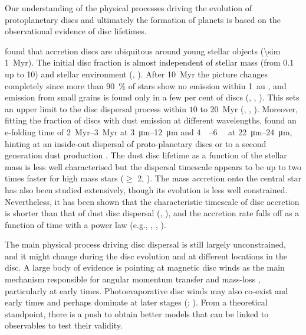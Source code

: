 \documentclass[usenatbib,useAMS,usedcolumn]{mnras}
\begin{document}
Our understanding of the physical processes driving the evolution of protoplanetary discs and ultimately the formation of planets is based on the observational evidence of disc lifetimes.

 found that accretion discs are ubiquitous around young stellar objects (\SI{\sim 1}{Myr}). The initial disc fraction is almost independent of stellar mass (from $0.1$ up to \SI{10}{\solarmass}) and stellar environment (, ).
After \SI{10}{Myr} the picture changes completely since more than \SI{90}{\percent} of stars show no emission within \SI{1}{\astronomicalunit} , and emission from small grains is found only in a few per cent of discs (, , ).
This sets an upper limit to the disc dispersal process within $10$ to \SI{20}{Myr} (, , ). Moreover, fitting the fraction of discs with dust emission at different wavelengths,  found an e-folding time of \SIrange{2}{3}{Myr} at \SIrange[]{3}{12}{\micro\meter} and \SIrange[]{4}{6}{\mega\year} at \SIrange[]{22}{24}{\micro\meter}, hinting at an inside-out dispersal of proto-planetary discs or to a second generation dust production .
The dust disc lifetime as a function of the stellar mass is less well characterised but the dispersal timescale appears to be up to two times faster for high mass stars ($\geq$ \SI{2}{\solarmass}, ).
The mass accretion onto the central star has also been studied extensively, though its evolution is less well constrained. Nevertheless, it has been shown that the characteristic timescale of disc accretion is shorter than that of dust disc dispersal (, ), and the accretion rate falls off as a function of time with a power law (e.g., , , ).

The main physical process driving disc dispersal is still largely unconstrained, and it might change during the disc evolution and at different locations in the disc. A large body of evidence is pointing at magnetic disc winds as the main mechanism responsible for angular momentum transfer and mass-loss , particularly at early times. Photoevaporative disc winds may also co-exist and early times and perhaps dominate at later stages (; ). From a theoretical standpoint, there is a push to obtain better models that can be linked to observables to test their validity.
\end{document}
